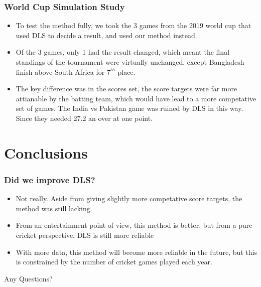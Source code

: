 \documentclass{beamer}
\begin{document}
\begin{frame}
    \frametitle{World Cup Simulation Study}
    \begin{itemize}
        \item To test the method fully, we took the 3 games from the 2019 world cup that used DLS to decide a result, 
            and used our method instead. 
        \pause
        \item Of the 3 games, only 1 had the result changed, which meant the final standings of the tournament were
            virtually unchanged, except Bangladesh finish above South Africa for $7^{th}$ place. 
        \pause
        \item The key difference was in the scores set, the score targets were far more attianable by the batting team,
            which would have lead to a more competative set of games. The India vs Pakistan game was ruined by DLS in this 
            way. Since they needed 27.2 an over at one point. 
    \end{itemize}
\end{frame}

\section{Conclusions}

\begin{frame}
    \frametitle{Did we improve DLS?}
    \begin{itemize}
        \item Not really. Aside from giving slightly more competative score targets, the method was still lacking. 
        \pause
        \item From an entertainment point of view, this method is better, but from a pure cricket perspective, 
            DLS is still more reliable
        \pause 
        \item With more data, this method will become more reliable in the future, but this is constrained by
            the number of cricket games played each year.
    \end{itemize}
\end{frame}

\begin{frame}
\Huge{\centerline{Any Questions?}}
\end{frame}
\end{document}
